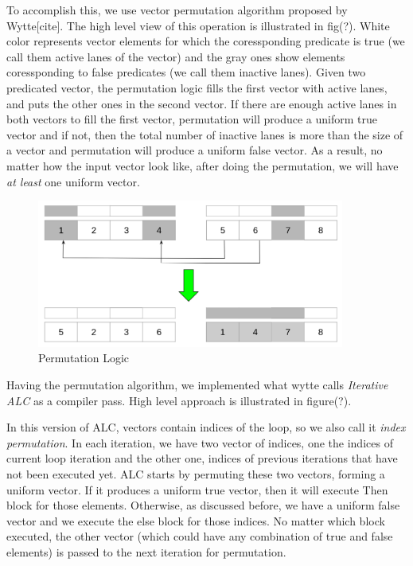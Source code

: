 \documentclass[\main/thesis.tex]{subfiles}
\begin{document}
To accomplish this, we use vector permutation algorithm proposed by Wytte[cite]. The high level view of this operation is illustrated in fig(?). White color represents vector elements for which the coressponding predicate is true (we call them active lanes of the vector) and the gray ones show elements coressponding to false predicates (we call them inactive lanes).
Given two predicated vector, the permutation logic fills the first vector with active lanes, and puts the other ones in the second vector. If there are enough active lanes in both vectors to fill the first vector, permutation will produce a uniform true vector and if not, then the total number of inactive lanes is more than the size of a vector and permutation will produce
a uniform false vector. As a result, no matter how the input vector look like, after doing the permutation, we will have \emph{at least} one uniform vector.

\begin{figure}[t!]
    \centering
    \includegraphics[width=0.90\textwidth]{img/permutation.png}
    \caption{Permutation Logic}
    \label{fig:permutation}
\end{figure}

Having the permutation algorithm, we implemented what wytte calls \emph{Iterative ALC} as a compiler pass. High level approach is illustrated in figure(?).

In this version of ALC, vectors contain indices of the loop, so we also call it \emph{index permutation}. In each iteration, we have two vector of indices, one the indices of current loop iteration and the other one, indices of previous iterations that have not been executed yet. ALC starts by permuting these two vectors, forming a uniform vector. If it produces a uniform true vector, then it will execute 
Then block for those elements. Otherwise, as discussed before, we have a uniform false vector and we execute the else block for those indices. No matter which block executed, the other vector (which could have any combination of true and false elements) is passed to the next iteration for permutation.
\end{document}
